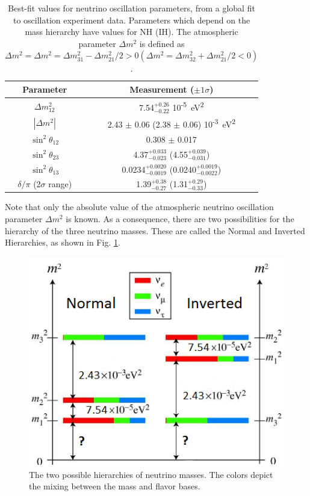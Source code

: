 \begin{table}[!htbp]
\caption{Best-fit values for neutrino oscillation parameters, from a global fit to oscillation experiment data.   Parameters which depend on the mass hierarchy have values for NH (IH).  The atmospheric parameter $\Delta m^{2}$ is defined as $\Delta m^{2} = \Delta m^{2} = \Delta m_{31}^{2} - \Delta m_{21}^{2}/2 > 0 (\Delta m^{2} = \Delta m_{32}^{2} + \Delta m_{21}^{2}/2 < 0)$. \cite{ReviewNuMass}} %
\label{table:nu_osc_vals}
\begin{tabular}{c|c}
Parameter & Measurement ($\pm 1 \sigma$) \\
\hline
$\Delta m_{12}^{2}$ & 7.54$^{+0.26}_{-0.22}$ 10\textsuperscript{-5}~eV\textsuperscript{2}\\
$|\Delta m^{2}|$ & 2.43 $\pm$ 0.06 (2.38 $\pm$ 0.06) 10\textsuperscript{-3}~eV\textsuperscript{2}\\
$\sin^{2} \theta_{12}$ & 0.308 $\pm$ 0.017\\
$\sin^{2} \theta_{23}$ & 4.37$^{+0.033}_{-0.023}$ (4.55$^{+0.039}_{-0.031}$)\\
$\sin^{2} \theta_{13}$ & 0.0234$^{+0.0020}_{-0.0019}$ (0.0240$^{+0.0019}_{-0.0022}$)\\
$\delta / \pi$ (2$\sigma$ range)& 1.39$^{+0.38}_{-0.27}$ (1.31$^{+0.29}_{-0.33}$)\\
\end{tabular}
\end{table}

Note that only the absolute value of the atmospheric neutrino oscillation parameter $\Delta m^{2}$ is known.  As a consequence, there are two possibilities for the hierarchy of the three neutrino masses.  These are called the Normal and Inverted Hierarchies, as shown in Fig. \ref{fig:numasshier}.

\begin{figure} %
        \centering
                \includegraphics[width=.5\textwidth]{figures/hierarchy_alterred.png}
                \caption{The two possible hierarchies of neutrino masses.  The colors depict the mixing between the mass and flavor bases.}
\label{fig:numasshier}
\end{figure}

